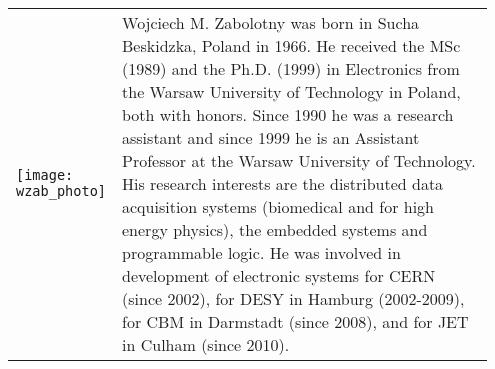\documentclass[preprint,11pt]{elsarticle}
\begin{document}
\vspace{1cm}
~\\
\begin{tabular}{p{0.15\linewidth}p{0.8\linewidth}}
  \begin{minipage}[b]{\linewidth}
    \texttt{[image: wzab\_photo]} 
  \end{minipage}
&
  \begin{minipage}[b]{\linewidth}
     Wojciech M. Zabolotny was born in Sucha Beskidzka,
Poland in 1966. He received the MSc (1989)
and the Ph.D. (1999) in Electronics from the
Warsaw University of Technology in Poland, both with honors.
Since 1990 he was a research assistant and since 1999 he
is an Assistant Professor at the 
Warsaw University of Technology.
His research interests are the distributed data acquisition
systems (biomedical and for high energy physics),
the embedded systems and programmable logic.
He was involved in development of electronic systems for
CERN (since 2002), for DESY in Hamburg (2002-2009),
for CBM in Darmstadt (since 2008),
and for JET in Culham (since 2010).


   \end{minipage}
\\
\end{tabular}
\end{document}
